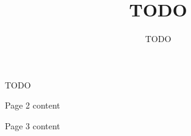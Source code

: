 \documentclass[a4paper, 11pt, margin=1cm, twocolumn]{article}
\title{TODO}
\author{TODO}
\begin{document}
\makeatletter %

\pagestyle{fancy}
\fancyhead{} %
\fancyhead[H]{\@title}
\fancyhead[F]{\@author}

TODO

\pagebreak

Page 2 content

\pagebreak

Page 3 content
\end{document}
